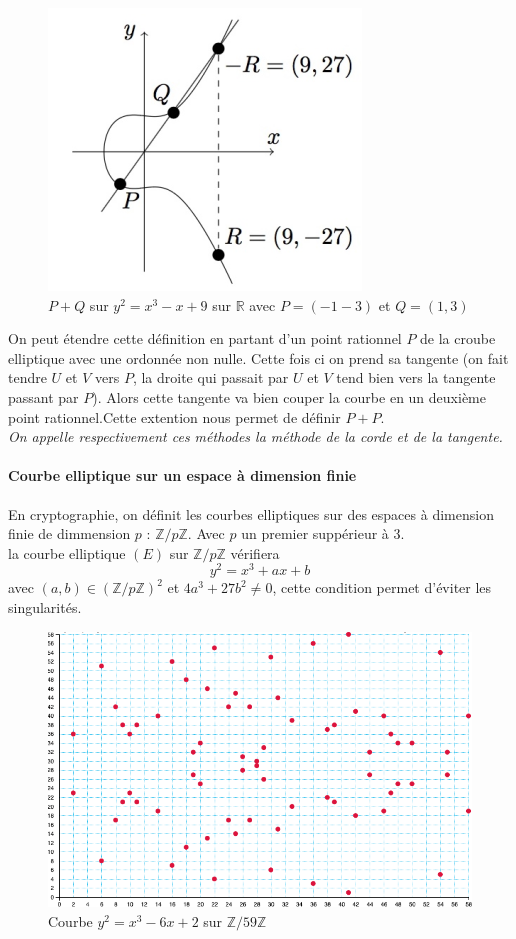 \documentclass[a4paper, 12pt]{article}
\begin{document}
\begin{figure}[h]
	\centering
	\includegraphics[width=.5\textwidth]{img/courbe1op.png}
	\caption{$P + Q$ sur $y^2 = x^3 - x + 9$ sur $\mathbb{R}$ avec $P = (-1-3)$ et $Q = (1,3)$}
	\label{courbe1op}
\end{figure}


\label{methodetangente}On peut étendre cette définition en partant d'un point rationnel $P$ de la croube elliptique avec une ordonnée non nulle. Cette fois ci on prend sa tangente (on fait tendre $U$ et $V$ vers $P$, la droite qui passait par $U$ et $V$ tend bien vers la tangente passant par $P$). Alors cette tangente va bien couper la courbe en un deuxième point rationnel.Cette extention nous permet de définir $P+P$. \\

\noindent\emph{On appelle respectivement ces méthodes la méthode de la corde et de la tangente.}

\paragraph{Courbe elliptique sur un espace à dimension finie}
En cryptographie, on définit les courbes elliptiques sur des espaces à dimension finie de dimmension $p$ : $\mathbb{Z}/p\mathbb{Z}$. Avec $p$ un premier suppérieur à 3. \\
la courbe elliptique $(E)$ sur $ \mathbb{Z}/p\mathbb{Z}$ vérifiera 
$$
y^2 = x^3 + ax + b
$$
avec $(a,b) \in \left(\mathbb{Z}/p\mathbb{Z}\right)^2$ et $4a^3 + 27b^2 \neq 0$, cette condition permet d'éviter les singularités. \\

\begin{figure}[h]
	\centering
	\includegraphics[width=.8\textwidth]{img/courbezpz.png}
	\caption{Courbe $y^2 = x^3 -6x + 2$ sur $ \mathbb{Z}/59\mathbb{Z}$}
	\label{courbezpz}
\end{figure}
\end{document}
